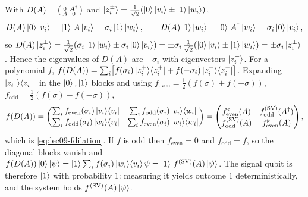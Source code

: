 \begin{solution}
With $D(A)=\bigl(\begin{smallmatrix}0&A^{\dagger}\\ A&0\end{smallmatrix}\bigr)$ and
$\ket{z_i^\pm}=\tfrac1{\sqrt2}(\ket0\ket{v_i}\pm\ket1\ket{w_i})$,
\[
  D(A)\ket0\ket{v_i}=\ket1\,A\ket{v_i}=\sigma_i\ket1\ket{w_i},\qquad
  D(A)\ket1\ket{w_i}=\ket0\,A^{\dagger}\ket{w_i}=\sigma_i\ket0\ket{v_i},
\]
so $D(A)\ket{z_i^\pm}=\tfrac1{\sqrt2}(\sigma_i\ket1\ket{w_i}\pm\sigma_i\ket0\ket{v_i})
=\pm\sigma_i\,\tfrac1{\sqrt2}(\ket0\ket{v_i}\pm\ket1\ket{w_i})=\pm\sigma_i\ket{z_i^\pm}$.
Hence the eigenvalues of $D(A)$ are $\pm\sigma_i$ with eigenvectors $\ket{z_i^\pm}$.
For a polynomial $f$, $f(D(A))=\sum_i\bigl[f(\sigma_i)\ket{z_i^+}\!\bra{z_i^+}+f(-\sigma_i)
\ket{z_i^-}\!\bra{z_i^-}\bigr]$. Expanding $\ket{z_i^\pm}\!\bra{z_i^\pm}$ in the $\ket0,\ket1$ blocks and using
$f_{\mathrm{even}}=\tfrac12(f(\sigma)+f(-\sigma))$,
$f_{\mathrm{odd}}=\tfrac12(f(\sigma)-f(-\sigma))$,
\[
  f(D(A))=\begin{pmatrix}
    \sum_i f_{\mathrm{even}}(\sigma_i)\ket{v_i}\!\bra{v_i} &
    \sum_i f_{\mathrm{odd}}(\sigma_i)\ket{v_i}\!\bra{w_i}\\[2pt]
    \sum_i f_{\mathrm{odd}}(\sigma_i)\ket{w_i}\!\bra{v_i} &
    \sum_i f_{\mathrm{even}}(\sigma_i)\ket{w_i}\!\bra{w_i}
  \end{pmatrix}
  =\begin{pmatrix}f^{\triangleleft}_{\mathrm{even}}(A)&f^{(\mathrm{SV})}_{\mathrm{odd}}
     (A^{\dagger})\\ f^{(\mathrm{SV})}_{\mathrm{odd}}(A)&f^{\triangleright}_{\mathrm{even}}(A)
     \end{pmatrix},
\]
which is \eqref{eq:lec09-fdilation}. If $f$ is odd then $f_{\mathrm{even}}=0$ and
$f_{\mathrm{odd}}=f$, so the diagonal blocks vanish and
$f(D(A))\ket0\ket\psi=\ket1\sum_i f(\sigma_i)\ket{w_i}\!\braket{v_i}{\psi}
=\ket1\,f^{(\mathrm{SV})}(A)\ket\psi$. The signal qubit is therefore $\ket1$ with
probability $1$: measuring it yields outcome $1$ deterministically, and the system holds
$f^{(\mathrm{SV})}(A)\ket\psi$.
\end{solution}

